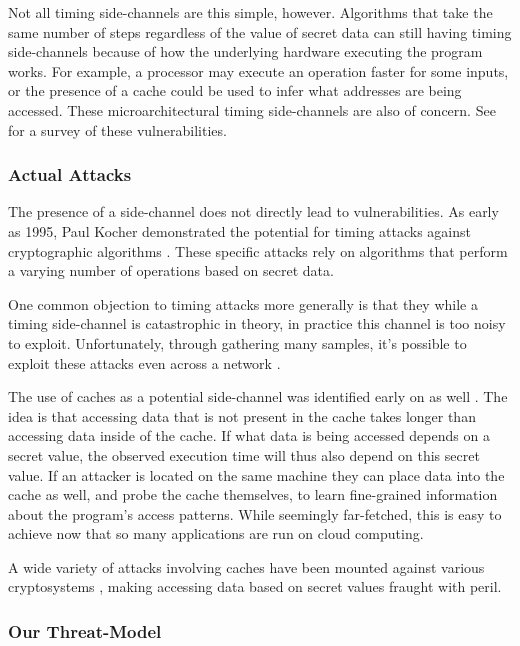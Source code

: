 \documentclass[11pt, a4paper]{article} %
\begin{document}
{Not all timing side-channels are this simple, however. Algorithms
that take the same number of steps regardless of the value of secret
data can still having timing side-channels because of how the underlying
hardware executing the program works. For example, a processor may
execute an operation faster for some inputs, or the presence of a cache
could be used to infer what addresses are being accessed. These
microarchitectural timing side-channels are also of concern.
See \cite{ge_survey_2018} for a survey of these vulnerabilities.

\subsubsection{Actual Attacks}

The presence of a side-channel does not directly lead to vulnerabilities.
As early as 1995, Paul Kocher
demonstrated the potential for timing attacks against cryptographic
algorithms \cite{kocher_cryptanalysis_1995, kocher_timing_1996}.
These specific attacks rely on algorithms that perform a varying number of
operations based on secret data. 

One common objection to timing attacks more generally is that they
while a timing side-channel is catastrophic in theory, in practice
this channel is too noisy to exploit. Unfortunately, through gathering
many samples, it's possible to exploit these attacks even across
a network \cite{brumley_remote_2005, brumley_remote_2011}.

The use of caches as a potential side-channel was
identified early on as well \cite{page_theoretical_2002}.
The idea is that accessing data that is not present in the cache
takes longer than accessing data inside of the cache. If what data
is being accessed depends on a secret value, the observed execution
time will thus also depend on this secret value. If an attacker is located
on the same machine they can place data into the cache as well, and probe
the cache themselves, to learn fine-grained information about the
program's access patterns. While seemingly far-fetched, this is easy
to achieve now that so many applications are run on cloud computing.

A wide variety of attacks involving caches have been mounted
against various cryptosystems
\cite{
  bernstein_cache-timing_2005,
  yarom_cachebleed_2017,
  cabrera_aldaya_cache-timing_2019}
, making accessing data based on secret
values fraught with peril.

\subsubsection{Our Threat-Model}
\label{threat_model}

}
\end{document}
